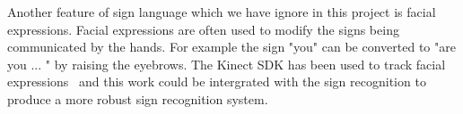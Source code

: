 Another feature of sign language which we have ignore in this project is facial expressions. Facial expressions are often used to modify the signs being communicated by the hands. For example the sign "you" can be converted to "are you ... " by raising the eyebrows. The Kinect SDK has been used to track facial expressions~\citep{Microsoft:2013:Face} and this work could be intergrated with the sign recognition to produce a more robust sign recognition system.



